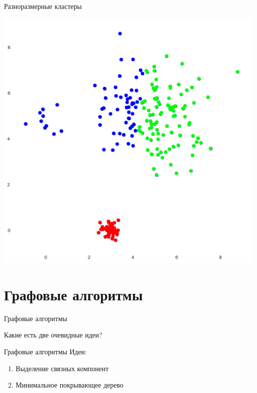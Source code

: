 \documentclass[10pt]{beamer}
\begin{document}
\begin{frame}{Разноразмерные кластеры}
	\begin{center}
	  \includegraphics[width=\textwidth, height=0.8 \textheight, keepaspectratio = true]{images/different_sizes-2}  
	\end{center}
\end{frame}

\section{Графовые алгоритмы}

\begin{frame}{Графовые алгоритмы}
  \begin{center}
    Какие есть две очевидные идеи?
  \end{center}    
\end{frame}

\begin{frame}{Графовые алгоритмы}
	Идеи:\\
	\begin{enumerate}
		\item Выделение связных компонент
		\item Минимальное покрывающее дерево
	\end{enumerate}
\end{frame}
\end{document}

